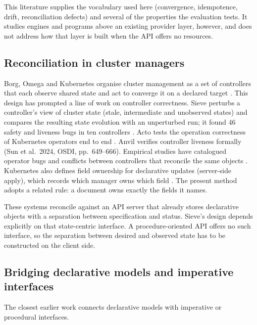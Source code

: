 This literature supplies the vocabulary used here (convergence, idempotence, drift, reconciliation
defects) and several of the properties the evaluation tests. It studies engines and programs above
an existing provider layer, however, and does not address how that layer is built when the API offers
no resources.

\subsection{Reconciliation in cluster managers}\label{sec:2.2}

Borg, Omega and Kubernetes organise cluster management as a set of controllers that each observe
shared state and act to converge it on a declared target
\citep{burns2016}. This design has prompted a line of work on
controller correctness. Sieve perturbs a controller's view of cluster state (stale, intermediate and
unobserved states) and compares the resulting state evolution with an unperturbed run; it found 46
safety and liveness bugs in ten controllers
\citep{sun2022}. Acto tests the
operation correctness of Kubernetes operators end to end
\citep{gu2023}. Anvil verifies controller liveness
formally (Sun et al.~2024, OSDI, pp.~649--666). Empirical studies have catalogued operator bugs
\citep{xu2024} and conflicts between controllers that
reconcile the same objects \citep{an2026}.
Kubernetes also defines field ownership for declarative updates (server-side apply), which records
which manager owns which field . The present method adopts a related rule: a document owns exactly
the fields it names.

These systems reconcile against an API server that already stores declarative objects with a
separation between specification and status. Sieve's design depends explicitly on that
state-centric interface. A procedure-oriented API offers no such interface, so the separation
between desired and observed state has to be constructed on the client side.

\subsection{Bridging declarative models and imperative interfaces}\label{sec:2.3}

The closest earlier work connects declarative models with imperative or procedural interfaces.

